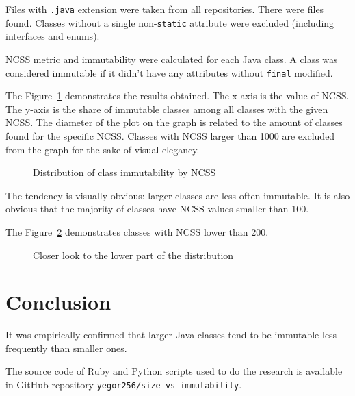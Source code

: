 \documentclass[12pt]{article}
\begin{document}
Files with \texttt{.java} extension were taken from all repositories.
There were \totaljavafiles{} files found. Classes without a single
non-\texttt{static} attribute were excluded (including interfaces and enums).

NCSS metric and immutability were calculated for each Java class.
A class was considered immutable if it didn't have any
attributes without \texttt{final} modified.

The Figure~\ref{fig:1} demonstrates the results obtained. The x-axis is
the value of NCSS. The y-axis is the share of immutable classes among
all classes with the given NCSS. The diameter of the plot on the graph
is related to the amount of classes found for the specific NCSS. Classes
with NCSS larger than 1000 are excluded from the graph for the sake of
visual elegancy.

\begin{figure}[h]
  
  \caption{Distribution of class immutability by NCSS}
  \label{fig:1}
\end{figure}

The tendency is visually obvious: larger classes are less often immutable. It
is also obvious that the majority of classes have NCSS values smaller than 100.

The Figure~\ref{fig:2} demonstrates classes with NCSS lower than 200.

\begin{figure}[h]
  
  \caption{Closer look to the lower part of the distribution}
  \label{fig:2}
\end{figure}

\section{Conclusion}

It was empirically confirmed that larger Java classes tend to be immutable
less frequently than smaller ones.

The source code of Ruby and Python scripts used to do the research
is available in GitHub repository \texttt{yegor256/size-vs-immutability}.
\end{document}
